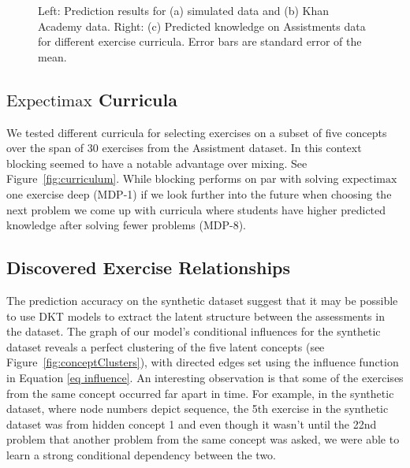 \documentclass{article} \usepackage{nips,times}
\begin{document}
 \begin{figure*}[t]
 \centering
 \caption{Left: Prediction results for (a) simulated data and (b) Khan Academy data. Right: (c) Predicted knowledge on Assistments data for different exercise curricula. Error bars are standard error of the mean.}
 \vspace{-3mm}
 \end{figure*}

\subsection{$\mathrm{Expectimax}$ Curricula}\label{sec expectimax}

We tested different curricula for selecting exercises on a subset of five concepts over the span of 30 exercises from the Assistment dataset. In this context blocking seemed to have a notable advantage over mixing. See Figure~\ref{fig:curriculum}. While blocking performs on par with solving $\mathrm{expectimax}$ one exercise deep (MDP-1) if we look further into the future when choosing the next problem we come up with curricula where students have higher predicted knowledge after solving fewer problems (MDP-8). 







\subsection{Discovered Exercise Relationships}\label{sec ex rel}

The prediction accuracy on the synthetic dataset suggest that it may be possible to use DKT models to extract the latent structure between the assessments in the dataset. The graph of our model's conditional influences for the synthetic dataset reveals a perfect clustering of the five latent concepts (see Figure~\ref{fig:conceptClusters}),
with directed edges set using the influence function in Equation \ref{eq influence}.
An interesting observation is that some of the exercises from the same concept occurred far apart in time. For example, in the synthetic dataset, where node numbers depict sequence, the 5th exercise in the synthetic dataset was from hidden concept 1 and even though it wasn't until the 22nd problem that another problem from the same concept was asked, we were able to learn a strong conditional dependency between the two.
\end{document}
